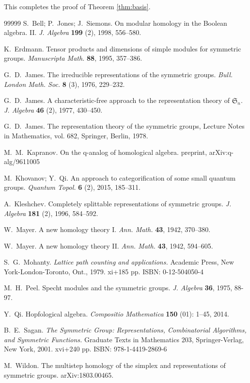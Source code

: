 \documentclass[a4paper]{amsart}
\numberwithin{equation}{subsection}
\theoremstyle{definition}
\numberwithin{equation}{subsection}
\begin{document}
This completes the proof of Theorem \ref{thm:basis}.


\begin{thebibliography}{99999}
 S.~Bell; P.~Jones; J.~Siemons.
On modular homology in the {B}oolean algebra. {II}.
{\it J. Algebra} {\bf 199} (2), 1998, 556--580.

 K.~Erdmann.
Tensor products and dimensions of simple modules for symmetric groups. {\it Manuscripta Math.} {\bf 88}, 1995, 357--386.

 G.~D.~James.
The irreducible representations of the symmetric groups.  {\it Bull. London Math. Soc.} {\bf 8} (3), 1976, 229--232.

 G.~D.~James.
A characteristic-free approach to the representation theory of $\mathfrak{S}_n$.  {\it J. Algebra} {\bf 46} (2), 1977, 430--450.

 G.~D.~James.  The representation theory of the symmetric groups, Lecture Notes in Mathematics, vol. 682, Springer, Berlin, 1978.

 M.~M.~Kapranov. On the q-analog of homological algebra. preprint, arXiv:q-alg/9611005

 M.~Khovanov; Y.~Qi.  An approach to categorification of some small quantum groups.  {\it Quantum Topol.} {\bf 6} (2), 2015, 185--311.

 A.~Kleshchev.  Completely splittable representations of symmetric groups.  {\it J. Algebra} {\bf 181} (2), 1996, 584--592.

 W.~Mayer. A new homology theory I. {\it Ann. Math.} {\bf 43}, 1942, 370–380.

 W.~Mayer. A new homology theory II. {\it Ann. Math.} {\bf 43}, 1942, 594–605.

 S.~G.~Mohanty. {\it Lattice path counting and applications.} Academic Press, New York-London-Toronto, Ont., 1979. xi+185 pp. ISBN: 0-12-504050-4

 M.~H.~Peel. Specht modules and the symmetric groups. {\it J. Algebra} {\bf 36}, 1975, 88-97.

 Y.~Qi.  Hopfological algebra.  {\it Compositio Mathematica} {\bf 150} (01): 1–45, 2014.

 B.~E.~Sagan. {\it The Symmetric Group: Representations, Combinatorial Algorithms, and Symmetric Functions.} Graduate Texts in Mathematics 203, Springer-Verlag, New York, 2001. xvi+240 pp. ISBN: 978-1-4419-2869-6

 M.~Wildon. The multistep homology of the simplex and representations of symmetric groups.  arXiv:1803.00465.
\end{thebibliography}
\end{document}
